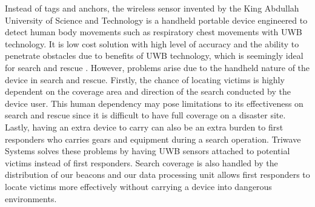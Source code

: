 \bigskip
Instead of tags and anchors, the wireless sensor invented by the King Abdullah University of Science and Technology is a handheld portable device engineered to detect human body movements such as respiratory chest movements with UWB technology. It is low cost solution with high level of accuracy and the ability to penetrate obstacles due to benefits of UWB technology, which is seemingly ideal for search and rescue \cite{R3-3}. However, problems arise due to the handheld nature of the device in search and rescue. Firstly, the chance of locating victims is highly dependent on the coverage area and direction of the search conducted by the device user. This human dependency may pose limitations to its effectiveness on search and rescue since it is difficult to have full coverage on a disaster site. Lastly, having an extra device to carry can also be an extra burden to first responders who carries gears and equipment during a search operation. Triwave Systems solves these problems by having UWB sensors attached to potential victims instead of first responders. Search coverage is also handled by the distribution of our beacons and our data processing unit allows first responders to locate victims more effectively without carrying a device into dangerous environments.



